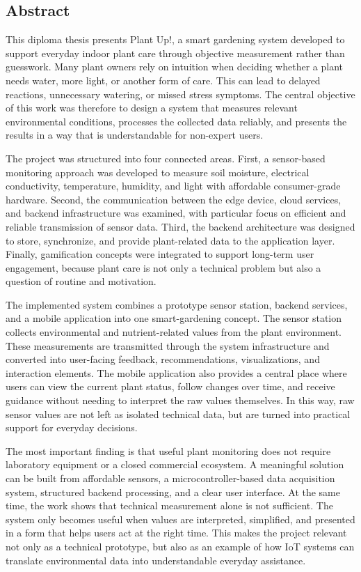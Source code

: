 \sloppy

\subsection*{Abstract}

This diploma thesis presents Plant Up!, a smart gardening system developed to support everyday indoor plant care through objective measurement rather than guesswork. Many plant owners rely on intuition when deciding whether a plant needs water, more light, or another form of care. This can lead to delayed reactions, unnecessary watering, or missed stress symptoms. The central objective of this work was therefore to design a system that measures relevant environmental conditions, processes the collected data reliably, and presents the results in a way that is understandable for non-expert users.

The project was structured into four connected areas. First, a sensor-based monitoring approach was developed to measure soil moisture, electrical conductivity, temperature, humidity, and light with affordable consumer-grade hardware. Second, the communication between the edge device, cloud services, and backend infrastructure was examined, with particular focus on efficient and reliable transmission of sensor data. Third, the backend architecture was designed to store, synchronize, and provide plant-related data to the application layer. Finally, gamification concepts were integrated to support long-term user engagement, because plant care is not only a technical problem but also a question of routine and motivation.

The implemented system combines a prototype sensor station, backend services, and a mobile application into one smart-gardening concept. The sensor station collects environmental and nutrient-related values from the plant environment. These measurements are transmitted through the system infrastructure and converted into user-facing feedback, recommendations, visualizations, and interaction elements. The mobile application also provides a central place where users can view the current plant status, follow changes over time, and receive guidance without needing to interpret the raw values themselves. In this way, raw sensor values are not left as isolated technical data, but are turned into practical support for everyday decisions.

The most important finding is that useful plant monitoring does not require laboratory equipment or a closed commercial ecosystem. A meaningful solution can be built from affordable sensors, a microcontroller-based data acquisition system, structured backend processing, and a clear user interface. At the same time, the work shows that technical measurement alone is not sufficient. The system only becomes useful when values are interpreted, simplified, and presented in a form that helps users act at the right time. This makes the project relevant not only as a technical prototype, but also as an example of how IoT systems can translate environmental data into understandable everyday assistance.

